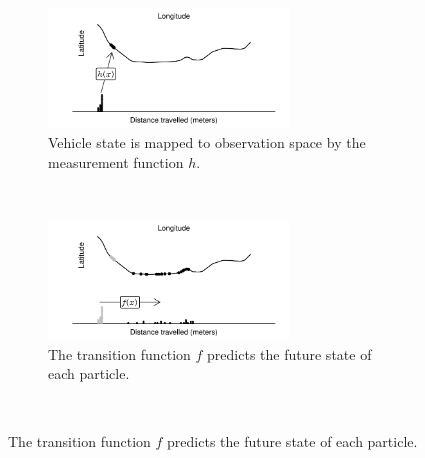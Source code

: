 \begin{figure}[p]
    \centering
    \begin{subfigure}[t]{0.9\textwidth}
        \centering
        \includegraphics[width=0.7\textwidth]{figures/03_particle_filter_1.pdf}
        \caption{
            Vehicle state is mapped to observation space by the
            measurement function $h$.   
        }
        \label{fig:pf_state_prev}
    \end{subfigure}\\
    \begin{subfigure}[t]{0.9\textwidth}
        \centering
        \includegraphics[width=0.7\textwidth]{figures/03_particle_filter_2.pdf}
        \caption{
            The transition function $f$ predicts the future state 
            of each particle.
        }
        \label{fig:pf_state_predict}
    \end{subfigure}\\

\end{figure}
